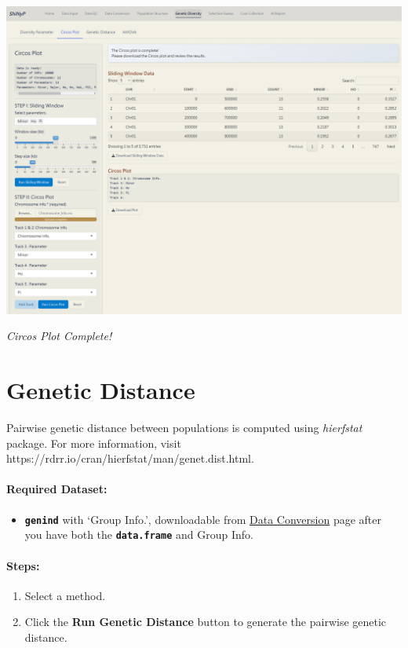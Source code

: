 \documentclass[
]{book}
\providecommand{\tightlist}{%
  \setlength{\itemsep}{0pt}\setlength{\parskip}{0pt}}
\begin{document}
\includegraphics{images/clipboard-3157688358.png}

\emph{Circos Plot Complete!}

\section{Genetic Distance}\label{genetic-distance}

Pairwise genetic distance between populations is computed using \emph{hierfstat} package. For more information, visit https://rdrr.io/cran/hierfstat/man/genet.dist.html.

\paragraph*{Required Dataset:}\label{required-dataset-6}

\begin{itemize}
\tightlist
\item
  {\textbf{\texttt{genind}}} with `Group Info.', downloadable from \ul{Data Conversion} page after you have both the {\textbf{\texttt{data.frame}}} and Group Info.
\end{itemize}

\paragraph*{\texorpdfstring{\textbf{Steps:}}{Steps:}}\label{steps-6}

\begin{enumerate}
\def\labelenumi{\arabic{enumi}.}
\item
  Select a method.
\item
  Click the {\textbf{Run Genetic Distance}} button to generate the pairwise genetic distance.
\end{enumerate}
\end{document}
